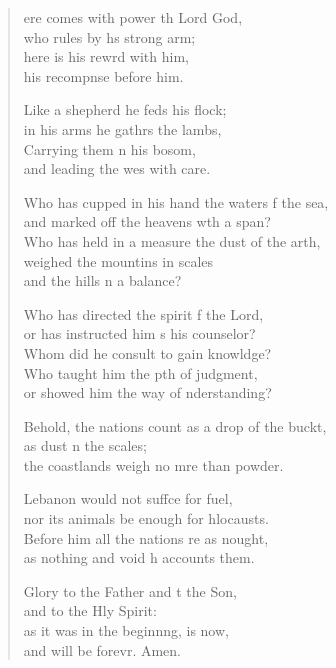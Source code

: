 \settowidth{\versewidth}{Behold, the nations count as a drop of the bucket, +}
\begin{verse}%
  \begin{patverse}
ere comes with power th Lord God,\Med\\
who rules by h\pointup{\i}s strong arm;\\
here is his rewrd with him,\Med\\
his recompnse before him.

Like a shepherd he feds his flock;\Med\\
in his arms he gathrs the lambs,\\
Carrying them \pointup{\i}n his bosom,\Med\\
and leading the wes with care.

Who has cupped in his hand the waters f the sea,\Med\\
and marked off the heavens w\pointup{\i}th a span?\\
Who has held in a measure the dust of the arth,\Flex\\
weighed the mountins in scales\Med\\
and the hills \pointup{\i}n a balance?

Who has directed the spirit f the Lord,\Med\\
or has instructed him s his counselor?\\
Whom did he consult to gain knowldge?\Flex\\
Who taught him the pth of judgment,\Med\\
or showed him the way of nderstanding?

Behold, the nations count as a drop of the buckt,\Flex\\
as dust n the scales;\Med\\
the coastlands weigh no mre than powder.

Lebanon would not suff\pointup{\i}ce for fuel,\Med\\
nor its animals be enough for hlocausts.\\
Before him all the nations re as nought,\Med\\
as nothing and void h accounts them.

Glory to the Father and t the Son,\Med\\
and to the Hly Spirit:\\
as it was in the beginn\pointup{\i}ng, is now,\Med\\
and will be forevr. Amen.
  \end{patverse}
\end{verse}
